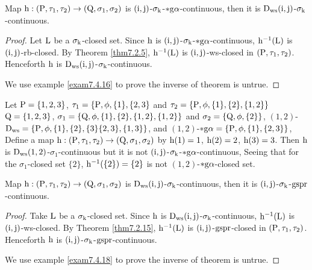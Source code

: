 \begin{thm}\label{thm7.4.15}
Map $\mathrm{h}:(\mathrm{P}, \tau_1, \tau_2 )\to (\mathrm{Q}, \sigma_{1}, \sigma_{2} )$ is $(\mathrm{i}, \mathrm{j})$-$\sigma_{\mathrm{k}}$-$*\mathrm{g}\alpha$-continuous, then it is $\mathrm{D}_{\mathrm{ws}}(\mathrm{i}, \mathrm{j})$-$\sigma_{\mathrm{k}}$-continuous.
\end{thm}

\begin{proof}
Let $\mathrm{L}$ be a $\sigma_{\mathrm{k}}$-closed set. Since $\mathrm{h}$ is $(\mathrm{i}, \mathrm{j})$-$\sigma_{\mathrm{k}}$-$*\mathrm{g}\alpha$-continuous, $\mathrm{h}^{-1} (\mathrm{L})$ is $(\mathrm{i}, \mathrm{j})$-rb-closed. By Theorem \ref{thm7.2.5}, $\mathrm{h}^{-1}(\mathrm{L})$ is $(\mathrm{i}, \mathrm{j})$-ws-closed in $(\mathrm{P}, \tau_1, \tau_2 )$. Henceforth $\mathrm{h}$ is $\mathrm{D}_{\mathrm{ws}} (\mathrm{i}, \mathrm{j})$-$\sigma_{\mathrm{k}}$-continuous.

We use example \ref{exam7.4.16} to prove the inverse of theorem is untrue.
\end{proof}

\begin{exm}\label{exam7.4.16}
Let $\mathrm{P}=\{1,2,3\}$, $\tau_1 =\{\mathrm{P}, \phi, \{1\},\{2,3\}$ and $\tau_2 =\{\TSP, \phi, \{1\},\{2\},\break \{1,2\}\}$ $\mathrm{Q}=\{1,2,3\}$, $\sigma_{1} =\{\mathrm{Q},\phi,\{1\},\{2\},\{1,2\},\{1,2\}\}$ and $\sigma_{2} =\{\mathrm{Q},\phi, \{2\}\}$, $(1,2)$-$\mathrm{D}_{\mathrm{ws}} =\{\mathrm{P}, \phi, \{1\},\{2\},\{3\}\{2,3\},\{1,3\}\}$, and $(1,2)$-$*\mathrm{g}\alpha =\{\mathrm{P}, \phi, \{1\},\{2,3\}\}$, Define a map $\mathrm{h}: (\mathrm{P}, \tau_1, \tau_2 )\to (\mathrm{Q}, \sigma_{1}, \sigma_{2} )$ by $\mathrm{h}(1)=1$, $\mathrm{h}(2)=2$, $\mathrm{h}(3)=3$. Then $\mathrm{h}$ is $\mathrm{D}_{\mathrm{ws}} (1, 2)$-$\sigma_{1}$-continuous but it is not $(\mathrm{i}, \mathrm{j})$-$\sigma_{\mathrm{k}}$-$*\mathrm{g}\alpha$-continuous, Seeing that for the $\sigma_{1}$-closed set $\{2\}$, $\mathrm{h}^{-1} (\{2\})=\{2\}$ is not $(1, 2)$-$*\mathrm{g}\alpha$-closed set.
\end{exm}

\begin{thm}\label{thm7.4.17}
Map $\mathrm{h}:(\mathrm{P}, \tau_1, \tau_2 )\to (\mathrm{Q}, \sigma_{1}, \sigma_{2} )$ is $\mathrm{D}_{\mathrm{ws}} (\mathrm{i}, \mathrm{j})$-$\sigma_{\mathrm{k}}$-continuous, then it is $(\mathrm{i}, \mathrm{j})$-$\sigma_{\mathrm{k}}$-$\mathrm{gspr}$-continuous.
\end{thm}

\begin{proof}
Take $\mathrm{L}$ be a $\sigma_{\mathrm{k}}$-closed set. Since $\mathrm{h}$ is $\mathrm{D}_{\mathrm{ws}}(\mathrm{i}, \mathrm{j})$-$\sigma_{\mathrm{k}}$-continuous, $\mathrm{h}^{-1}(\mathrm{L})$ is $(\mathrm{i}, \mathrm{j})$-ws-closed. By Theorem \ref{thm7.2.15}, $\mathrm{h}^{-1} (\mathrm{L})$ is $(\mathrm{i}, \mathrm{j})$-$\mathrm{gspr}$-closed in $(\mathrm{P}, \tau_1, \tau_2 )$. Henceforth $\mathrm{h}$ is $(\mathrm{i}, \mathrm{j})$-$\sigma_{\mathrm{k}}$-$\mathrm{gspr}$-continuous.

We use example \ref{exam7.4.18} to prove the inverse of theorem is untrue.
\end{proof}

